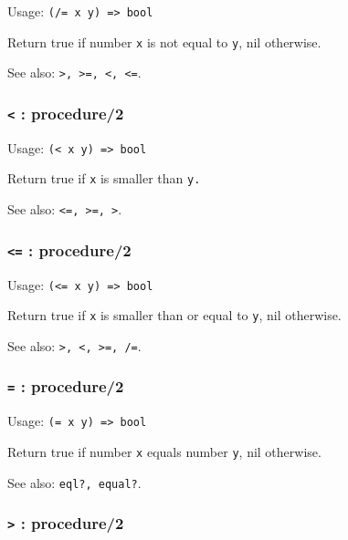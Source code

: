 \documentclass[
]{article}
\newcommand{\passthrough}[1]{#1}
\begin{document}
Usage: \passthrough{\lstinline!(/= x y) => bool!}

Return true if number \passthrough{\lstinline!x!} is not equal to
\passthrough{\lstinline!y!}, nil otherwise.

See also: \passthrough{\lstinline!>, >=, <, <=!}.

\hypertarget{procedure2-2}{%
\subsubsection{\texorpdfstring{\texttt{\textless{}} :
procedure/2}{\textless{} : procedure/2}}\label{procedure2-2}}

Usage: \passthrough{\lstinline!(< x y) => bool!}

Return true if \passthrough{\lstinline!x!} is smaller than
\passthrough{\lstinline!y.!}

See also: \passthrough{\lstinline!<=, >=, >!}.

\hypertarget{procedure2-3}{%
\subsubsection{\texorpdfstring{\texttt{\textless{}=} :
procedure/2}{\textless= : procedure/2}}\label{procedure2-3}}

Usage: \passthrough{\lstinline!(<= x y) => bool!}

Return true if \passthrough{\lstinline!x!} is smaller than or equal to
\passthrough{\lstinline!y!}, nil otherwise.

See also: \passthrough{\lstinline!>, <, >=, /=!}.

\hypertarget{procedure2-4}{%
\subsubsection{\texorpdfstring{\texttt{=} :
procedure/2}{= : procedure/2}}\label{procedure2-4}}

Usage: \passthrough{\lstinline!(= x y) => bool!}

Return true if number \passthrough{\lstinline!x!} equals number
\passthrough{\lstinline!y!}, nil otherwise.

See also: \passthrough{\lstinline!eql?, equal?!}.

\hypertarget{procedure2-5}{%
\subsubsection{\texorpdfstring{\texttt{\textgreater{}} :
procedure/2}{\textgreater{} : procedure/2}}\label{procedure2-5}}
\end{document}
